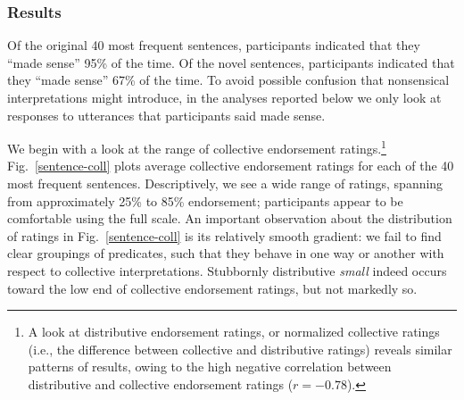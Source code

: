 \documentclass[linguex]{sp}
\newcommand{\ndg}[1]{\textcolor{Green}{[ndg: #1]}}
\begin{document}
%

\subsubsection{Results}

Of the original 40 most frequent sentences, participants indicated that they ``made sense'' 95\% of the time. Of the novel sentences, participants indicated that they ``made sense'' 67\% of the time.
To avoid possible confusion that nonsensical interpretations might introduce, in the analyses reported below we only look at responses to utterances that participants said made sense. %

We begin with a look at the range of collective endorsement ratings.\footnote{A look at distributive endorsement ratings, or normalized collective ratings (i.e., the difference between collective and distributive ratings) reveals similar patterns of results, owing to the high negative correlation between distributive and collective endorsement ratings ($r=-0.78$).} Fig.~\ref{sentence-coll} plots average collective endorsement ratings for each of the 40 most frequent sentences. Descriptively, we see a wide range of ratings, spanning from approximately 25\%  to 85\% endorsement; participants appear to be comfortable using the full scale. An important observation about the distribution of ratings in Fig.~\ref{sentence-coll} is its relatively smooth gradient: we fail to find clear groupings of predicates, such that they behave in one way or another with respect to collective interpretations. Stubbornly distributive \emph{small} indeed occurs toward the low end of collective endorsement ratings, but not markedly so.
\end{document}
